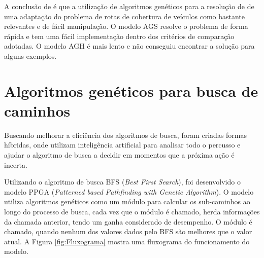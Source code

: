 A conclusão de \cite{Washington} é que a utilização de algoritmos genéticos para a resolução de de uma adaptação do problema de rotas de cobertura de veículos como bastante relevantes e de fácil manipulação. O modelo AGS resolve o problema de forma rápida e tem uma fácil implementação dentro dos critérios de comparação adotadas. O modelo AGH é mais lento e não conseguiu encontrar a solução para alguns exemplos.

\section{Algoritmos genéticos para busca de caminhos}

Buscando melhorar a eficiência dos algoritmos de busca, foram criadas formas híbridas, onde utilizam inteligência artificial para analisar todo o percusso e ajudar o algoritmo de busca a decidir em momentos que a próxima ação é incerta.

Utilizando o algoritmo de busca BFS (\textit{Best First Search}), foi desenvolvido o modelo PPGA (\textit{Patterned based Pathfinding with Genetic Algorithm}). O modelo utiliza algoritmos genéticos como um módulo para calcular os sub-caminhos ao longo do processo de busca, cada vez que o módulo é chamado, herda informações da chamada anterior, tendo um ganha considerado de desempenho. O módulo é chamado, quando nenhum dos valores dados pelo BFS são melhores que o valor atual. A Figura \ref{fig:Fluxograma}  mostra uma fluxograma do funcionamento do modelo.

